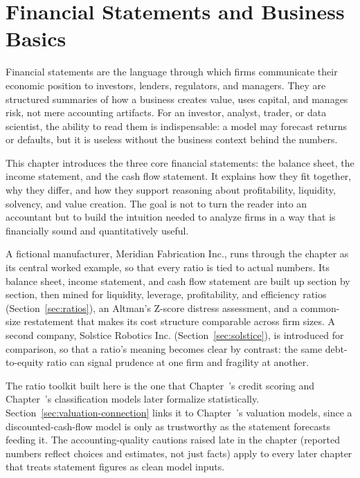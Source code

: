 \documentclass[../ai_in_finance]{subfiles}
\begin{document}
\chapter{Financial Statements and Business Basics}

Financial statements are the language through which firms communicate their economic position to investors, lenders, regulators, and managers. They are structured summaries of how a business creates value, uses capital, and manages risk, not mere accounting artifacts. For an investor, analyst, trader, or data scientist, the ability to read them is indispensable: a model may forecast returns or defaults, but it is useless without the business context behind the numbers.

This chapter introduces the three core financial statements: the balance sheet, the income statement, and the cash flow statement. It explains how they fit together, why they differ, and how they support reasoning about profitability, liquidity, solvency, and value creation. The goal is not to turn the reader into an accountant but to build the intuition needed to analyze firms in a way that is financially sound and quantitatively useful.

A fictional manufacturer, Meridian Fabrication Inc., runs through the chapter as its central worked example, so that every ratio is tied to actual numbers. Its balance sheet, income statement, and cash flow statement are built up section by section, then mined for liquidity, leverage, profitability, and efficiency ratios (Section~\ref{sec:ratios}), an Altman's Z-score distress assessment, and a common-size restatement that makes its cost structure comparable across firm sizes. A second company, Solstice Robotics Inc. (Section~\ref{sec:solstice}), is introduced for comparison, so that a ratio's meaning becomes clear by contrast: the same debt-to-equity ratio can signal prudence at one firm and fragility at another.

The ratio toolkit built here is the one that Chapter~'s credit scoring and Chapter~'s classification models later formalize statistically. Section~\ref{sec:valuation-connection} links it to Chapter~'s valuation models, since a discounted-cash-flow model is only as trustworthy as the statement forecasts feeding it. The accounting-quality cautions raised late in the chapter (reported numbers reflect choices and estimates, not just facts) apply to every later chapter that treats statement figures as clean model inputs.
\end{document}
